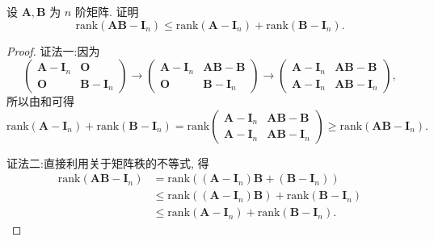 \documentclass[../../main.tex]{subfiles}%
\begin{document}
\begin{proposition}\label{proposition:矩阵与单位阵差相关不等式}
设 $\boldsymbol{A},\boldsymbol{B}$ 为 $n$ 阶矩阵. 证明
\[
\mathrm{rank}(\boldsymbol{AB} - \boldsymbol{I}_n) \leqslant \mathrm{rank}(\boldsymbol{A} - \boldsymbol{I}_n) + \mathrm{rank}(\boldsymbol{B} - \boldsymbol{I}_n).
\]
\end{proposition}
\begin{proof}

{\color{blue}证法一:}因为
\[
\begin{pmatrix} 
\boldsymbol{A} - \boldsymbol{I}_n & \boldsymbol{O} \\
\boldsymbol{O} & \boldsymbol{B} - \boldsymbol{I}_n 
\end{pmatrix} \to \begin{pmatrix} 
\boldsymbol{A} - \boldsymbol{I}_n & \boldsymbol{AB} - \boldsymbol{B} \\
\boldsymbol{O} & \boldsymbol{B} - \boldsymbol{I}_n 
\end{pmatrix} \to \begin{pmatrix} 
\boldsymbol{A} - \boldsymbol{I}_n & \boldsymbol{AB} - \boldsymbol{B} \\
\boldsymbol{A} - \boldsymbol{I}_n & \boldsymbol{AB} - \boldsymbol{I}_n 
\end{pmatrix},
\]
所以由和可得
\[
\mathrm{rank}(\boldsymbol{A} - \boldsymbol{I}_n) + \mathrm{rank}(\boldsymbol{B} - \boldsymbol{I}_n) = \mathrm{rank}\begin{pmatrix} 
\boldsymbol{A} - \boldsymbol{I}_n & \boldsymbol{AB} - \boldsymbol{B} \\
\boldsymbol{A} - \boldsymbol{I}_n & \boldsymbol{AB} - \boldsymbol{I}_n 
\end{pmatrix} \geqslant \mathrm{rank}(\boldsymbol{AB} - \boldsymbol{I}_n).
\]

{\color{blue}证法二:}直接利用关于矩阵秩的不等式, 得
\begin{align*}
\mathrm{rank}(\boldsymbol{AB} - \boldsymbol{I}_n) &= \mathrm{rank}((\boldsymbol{A} - \boldsymbol{I}_n)\boldsymbol{B} + (\boldsymbol{B} - \boldsymbol{I}_n)) \\
&\leqslant \mathrm{rank}((\boldsymbol{A} - \boldsymbol{I}_n)\boldsymbol{B}) + \mathrm{rank}(\boldsymbol{B} - \boldsymbol{I}_n) \\
&\leqslant \mathrm{rank}(\boldsymbol{A} - \boldsymbol{I}_n) + \mathrm{rank}(\boldsymbol{B} - \boldsymbol{I}_n).
\end{align*}
\end{proof}
\end{document}
